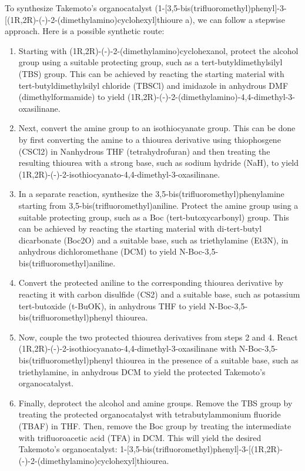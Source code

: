 \documentclass[10pt]{article}
\begin{document}
\begin{myquote}
    To synthesize Takemoto's organocatalyst
(1-[3,5-bis(trifluoromethyl)phenyl]-3-[(1R,2R)-(-)-2-(dimethylamino)cyclohexyl]thioure
a), we can follow a stepwise approach. 
Here is a possible synthetic route:
\begin{enumerate}
    \item Starting with (1R,2R)-(-)-2-(dimethylamino)cyclohexanol, protect the alcohol group using a suitable protecting group, such as a tert-butyldimethylsilyl (TBS) group. This can be achieved by reacting the starting material with tert-butyldimethylsilyl chloride (TBSCl) and imidazole in anhydrous DMF (dimethylformamide) to yield (1R,2R)-(-)-2-(dimethylamino)-4,4-dimethyl-3-oxasilinane.
    \item Next, convert the amine group to an isothiocyanate group. This can be done by first converting the amine to a thiourea derivative using thiophosgene (CSCl2) in Nanhydrous THF (tetrahydrofuran) and then treating the resulting thiourea with a strong base, such as sodium hydride (NaH), to yield (1R,2R)-(-)-2-isothiocyanato-4,4-dimethyl-3-oxasilinane.
    \item In a separate reaction, synthesize the 3,5-bis(trifluoromethyl)phenylamine starting from 3,5-bis(trifluoromethyl)aniline. Protect the amine group using a suitable protecting group, such as a Boc (tert-butoxycarbonyl) group. This can be achieved by reacting the starting material with di-tert-butyl dicarbonate (Boc2O) and a suitable base, such as triethylamine (Et3N), in anhydrous dichloromethane (DCM) to yield N-Boc-3,5-bis(trifluoromethyl)aniline.
    \item Convert the protected aniline to the corresponding thiourea derivative by reacting it with carbon disulfide (CS2) and a suitable base, such as potassium tert-butoxide (t-BuOK), in anhydrous THF to yield N-Boc-3,5-bis(trifluoromethyl)phenyl thiourea.
    \item Now, couple the two protected thiourea derivatives from steps 2 and 4. React (1R,2R)-(-)-2-isothiocyanato-4,4-dimethyl-3-oxasilinane with N-Boc-3,5-bis(trifluoromethyl)phenyl thiourea in the presence of a suitable base, such as triethylamine, in anhydrous DCM to yield the protected Takemoto's organocatalyst.
    \item Finally, deprotect the alcohol and amine groups. Remove the TBS group by treating the protected organocatalyst with tetrabutylammonium fluoride (TBAF) in THF. Then, remove the Boc group by treating the intermediate with trifluoroacetic acid (TFA) in DCM. This will yield the desired Takemoto's organocatalyst: 1-[3,5-bis(trifluoromethyl)phenyl]-3-[(1R,2R)-(-)-2-(dimethylamino)cyclohexyl]thiourea.
\end{enumerate}
\end{myquote}
\end{document}
